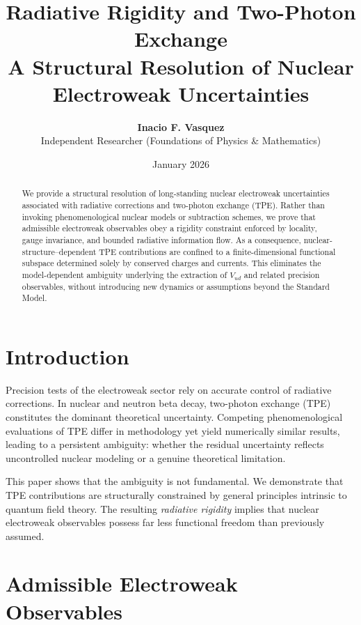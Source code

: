 \documentclass[11pt,a4paper]{article}
\title{\Large\textbf{Radiative Rigidity and Two-Photon Exchange}\\[0.4em]
\large A Structural Resolution of Nuclear Electroweak Uncertainties}
\author{\textbf{Inacio F. Vasquez}\\
Independent Researcher (Foundations of Physics \& Mathematics)}
\date{January 2026}
\begin{document}
\maketitle
\begin{abstract}
We provide a structural resolution of long-standing nuclear electroweak
uncertainties associated with radiative corrections and two-photon exchange
(TPE). Rather than invoking phenomenological nuclear models or subtraction
schemes, we prove that admissible electroweak observables obey a rigidity
constraint enforced by locality, gauge invariance, and bounded radiative
information flow. As a consequence, nuclear-structure–dependent TPE
contributions are confined to a finite-dimensional functional subspace
determined solely by conserved charges and currents. This eliminates the
model-dependent ambiguity underlying the extraction of $V_{ud}$ and related
precision observables, without introducing new dynamics or assumptions beyond
the Standard Model.
\end{abstract}


\section{Introduction}

Precision tests of the electroweak sector rely on accurate control of radiative
corrections. In nuclear and neutron beta decay, two-photon exchange (TPE)
constitutes the dominant theoretical uncertainty. Competing phenomenological
evaluations of TPE differ in methodology yet yield numerically similar results,
leading to a persistent ambiguity: whether the residual uncertainty reflects
uncontrolled nuclear modeling or a genuine theoretical limitation.

This paper shows that the ambiguity is not fundamental. We demonstrate that
TPE contributions are structurally constrained by general principles intrinsic
to quantum field theory. The resulting \emph{radiative rigidity} implies that
nuclear electroweak observables possess far less functional freedom than
previously assumed.

\section{Admissible Electroweak Observables}
\end{document}
